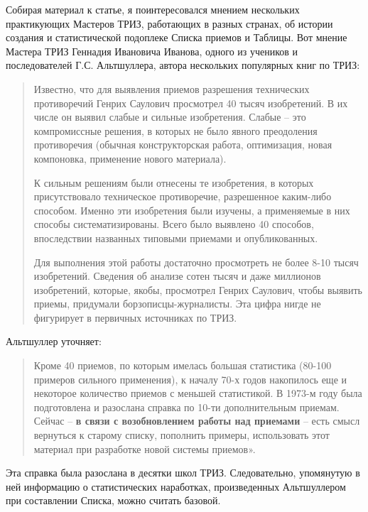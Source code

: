 \documentclass[11pt,a4paper]{article}
\begin{document}
Собирая материал к статье, я поинтересовался мнением нескольких практикующих
Мастеров ТРИЗ, работающих в разных странах, об истории создания и
статистической подоплеке Списка приемов и Таблицы. Вот мнение Мастера ТРИЗ
Геннадия Ивановича Иванова, одного из учеников и последователей
Г.С. Альтшуллера, автора нескольких популярных книг по ТРИЗ:
\begin{quote}
  Известно, что для выявления приемов разрешения технических противоречий
  Генрих Саулович просмотрел 40 тысяч изобретений. В их числе он выявил слабые
  и сильные изобретения. Слабые -- это компромиссные решения, в которых не
  было явного преодоления противоречия (обычная конструкторская работа,
  оптимизация, новая компоновка, применение нового материала).

  К сильным решениям были отнесены те изобретения, в которых присутствовало
  техническое противоречие, разрешенное каким-либо способом. Именно эти
  изобретения были изучены, а применяемые в них способы систематизированы.
  Всего было выявлено 40 способов, впоследствии названных типовыми приемами и
  опубликованных.

  Для выполнения этой работы достаточно просмотреть не более 8-10 тысяч
  изобретений. Сведения об анализе сотен тысяч и даже миллионов изобретений,
  которые, якобы, просмотрел Генрих Саулович, чтобы выявить приемы, придумали
  борзописцы-журналисты. Эта цифра нигде не фигурирует в первичных источниках
  по ТРИЗ.
\end{quote}
Альтшуллер уточняет:
\begin{quote}
  Кроме 40 приемов, по которым имелась большая статистика (80-100 примеров
  сильного применения), к началу 70-х годов накопилось еще и некоторое
  количество приемов с меньшей статистикой. В 1973-м году была подготовлена и
  разослана справка по 10-ти дополнительным приемам. Сейчас -- \textbf{в связи
    с возобновлением работы над приемами} -- есть смысл вернуться к старому
  списку, пополнить примеры, использовать этот материал при разработке новой
  системы приемов». \cite{Altshuller1973a}
\end{quote}
Эта справка была разослана в десятки школ ТРИЗ. Следовательно, упомянутую в
ней информацию о статистических наработках, произведенных Альтшуллером при
составлении Списка, можно считать базовой.
\end{document}
